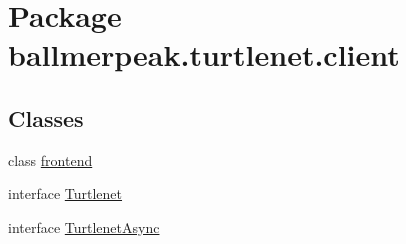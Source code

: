 \hypertarget{namespaceballmerpeak_1_1turtlenet_1_1client}{\section{Package ballmerpeak.\-turtlenet.\-client}
\label{namespaceballmerpeak_1_1turtlenet_1_1client}
}
\subsection*{Classes}
\begin{DoxyCompactItemize}
\item 
class \hyperlink{classballmerpeak_1_1turtlenet_1_1client_1_1frontend}{frontend}
\item 
interface \hyperlink{interfaceballmerpeak_1_1turtlenet_1_1client_1_1Turtlenet}{Turtlenet}
\item 
interface \hyperlink{interfaceballmerpeak_1_1turtlenet_1_1client_1_1TurtlenetAsync}{Turtlenet\-Async}
\end{DoxyCompactItemize}
